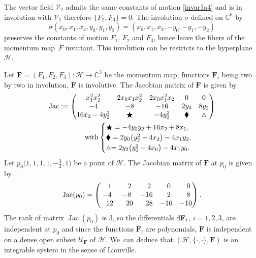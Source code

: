 \documentclass[10pt,a4paper]{amsart}
\numberwithin{equation}{section}
\begin{document}
The vector field $\mathcal{V}_2$ admits the same constants of
 motion \eqref{invar1a4} and is in involution with $\mathcal{V}_1$ therefore $\{F_2,F_3\}=0$. The involution $\sigma$ defined on $\mathbb{C}^6$ by
 \[\sigma(x_0,x_1,x_2,y_0,y_1,y_2)=(x_0,x_1,x_2, -y_0,-y_1,-y_2)
 \]
 preserves the constants of motion $F_1$, $F_2$ and $F_3$, hence leave the fibers of the momentum map~$F$ invariant. This involution can be restricts to the hyperplane $\mathcal{H}$.

Let $\mathbf{F}=(F_1,F_2,F_3)\colon \mathcal{H} \rightarrow
\mathbb{C}^3$ be the momentum map; functions $\mathbf{F}_i$ being
two by two in involution, $\mathbf{F}$ is involutive. The Jacobian
matrix of $\mathbf{F}$ is given by
\begin{gather*}
\operatorname{Jac}:=\begin{pmatrix}
 x_1^2x_2^2 & 2x_0x_1x_2^2 & 2x_0x_1^2x_2 & 0& 0 \\
 -4 & -8 & -16 & 2y_0 & 8y_2 \\
 16x_2-4y_2^2 & \bigstar & -4y_0^2 & \blacklozenge &\vartriangle
 \end{pmatrix}\\
 \hphantom{\operatorname{Jac}:=}{}\text{with}
 \begin{cases}
 \bigstar=-4y_0y_2+16x_2+8x_1, \\
 \blacklozenge=2y_0\bigl(y_2^2-4x_2\bigr)-4x_1y_2, \\
 \vartriangle= 2y_2\bigl(y_0^2-4x_0\bigr)-4x_1y_0.
 \end{cases}
 \end{gather*}
 Let $p_0\bigl(1,1,1,1,-\frac{3}{2},1\bigr)$ be
a point of $\mathcal{H}$. The Jacobian matrix of $\mathbf{F}$ at
$p_0$ is given by
\[\operatorname{Jac}(p_0)=\begin{pmatrix}
 \hphantom{-}1 & \hphantom{-}2 & \hphantom{-}2 & \hphantom{-}0 & \hphantom{-}0 \\
 -4 & -8 & -16 & \hphantom{-}2 & \hphantom{-}8 \\
 \hphantom{-}12 & \hphantom{-}20 & \hphantom{-}28 & -10 & -10
 \end{pmatrix}.\]
The rank of matrix $\operatorname{Jac}(p_0)$ is $3$, so the
differentials ${\rm d}\mathbf{F}_i$, $i=1,2,3$, are
independent at $p_0$ and since the functions $\mathbf{F}_i$ are
polynomials, $\mathbf{F}$ is independent on a dense open subset
$\mathcal{U}_{\mathbf{F}}$ of $\mathcal{H}$.
We~can deduce that $(\mathcal{H},\{\cdot,\cdot\},\mathbf{F})$ is an integrable system in the sense of Liouville.
\end{document}
